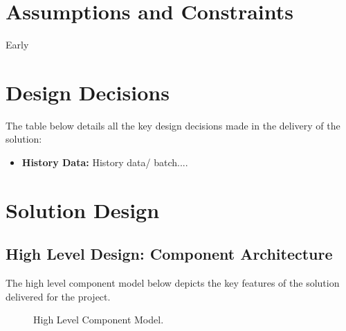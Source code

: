 \documentclass[12pt]{article} %
\begin{document}
	 

	\section{Assumptions and Constraints}
	
	Early  
	\section {Design Decisions}
	
	The table below details all the key design decisions made in the delivery of the solution:
	
\begin{itemize} 
	\item \textbf{History Data:} History data/ batch....
\end{itemize}
	
	
	

	
	
	

	
	\section{Solution Design}
		
	\subsection{High Level Design: Component Architecture}
	The high level component model below depicts the key features of the solution delivered for the project.
	
	
		\begin{figure}[H] %
			\caption{High Level Component Model.}
			\label{fig:speciation}
		\end{figure}
		
\end{document}
